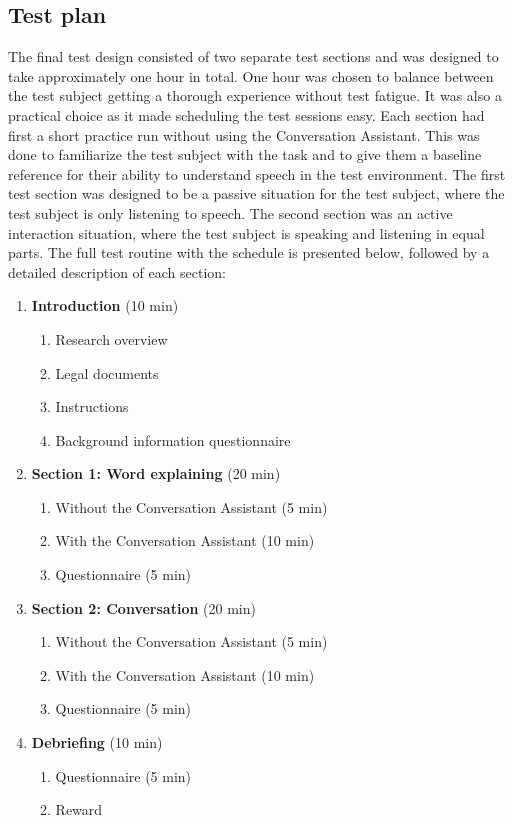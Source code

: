 \documentclass[english, 12pt, a4paper, pdftex, elec, utf8]{aaltothesis}
\begin{document}
\subsection{Test plan} \label{sec:testplan}

The final test design consisted of two separate test sections and was designed to take approximately one hour in total. One hour was chosen to balance between the test subject getting a thorough experience without test fatigue. It was also a practical choice as it made scheduling the test sessions easy. Each section had first a short practice run without using the Conversation Assistant. This was done to familiarize the test subject with the task and to give them a baseline reference for their ability to understand speech in the test environment. The first test section was designed to be a passive situation for the test subject, where the test subject is only listening to speech. The second section was an active interaction situation, where the test subject is speaking and listening in equal parts. The full test routine with the schedule is presented below, followed by a detailed description of each section:
\vspace{1mm}
\begin{enumerate}[font=\bfseries]
	\item \textbf{Introduction} (10 min)
	\begin{enumerate}[label*=\arabic*.]
		\item Research overview
		\item Legal documents
		\item Instructions
		\item Background information questionnaire
	\end{enumerate}
	\item \textbf{Section 1: Word explaining} (20 min)
	\begin{enumerate}[label*=\arabic*.]
		\item Without the Conversation Assistant (5 min)
		\item With the Conversation Assistant (10 min)
		\item Questionnaire (5 min)
	\end{enumerate}
	\item \textbf{Section 2: Conversation} (20 min)
	\begin{enumerate}[label*=\arabic*.]
		\item Without the Conversation Assistant (5 min)
		\item With the Conversation Assistant (10 min)
		\item Questionnaire (5 min)
	\end{enumerate}
	\item \textbf{Debriefing} (10 min)
	\begin{enumerate}[label*=\arabic*.]
		\item Questionnaire (5 min)
		\item Reward \\
	\end{enumerate}
\end{enumerate}
\end{document}
